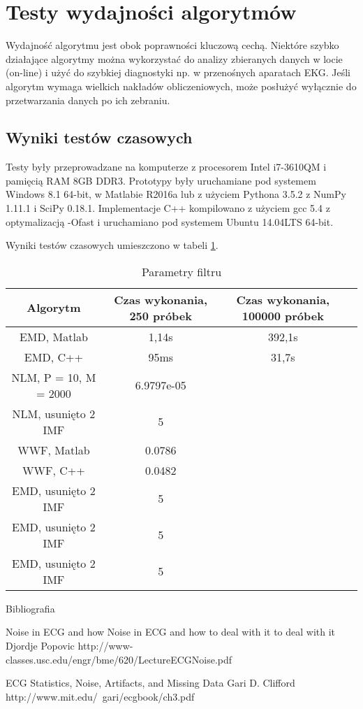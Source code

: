 \section{Testy wydajności algorytmów}

Wydajność algorytmu jest obok poprawności kluczową cechą. Niektóre szybko działające algorytmy można wykorzystać do analizy zbieranych danych w locie (on-line) i użyć do szybkiej diagnostyki np. w przenośnych aparatach EKG. Jeśli algorytm wymaga wielkich nakładów obliczeniowych, może posłużyć wyłącznie do przetwarzania danych po ich zebraniu.

\subsection{Wyniki testów czasowych}

Testy były przeprowadzane na komputerze z procesorem Intel i7-3610QM i pamięcią RAM 8GB DDR3. Prototypy były uruchamiane pod systemem Windows 8.1 64-bit, w Matlabie R2016a lub z użyciem Pythona 3.5.2 z NumPy 1.11.1 i SciPy 0.18.1. Implementacje C++ kompilowano z użyciem gcc 5.4 z optymalizacją -Ofast i uruchamiano pod systemem Ubuntu 14.04LTS 64-bit.

Wyniki testów czasowych umieszczono w tabeli \ref{tab:time}.

\begin{table}[!htb]
  \centering
  \begin{tabular}{|c|c|c|c|}
  \hline 
  Algorytm  & Czas wykonania, 250 próbek & Czas wykonania, 100000 próbek \\  
  \hline 
  EMD, Matlab & 1,14s & 392,1s\\
  \hline
  EMD, C++ & 95ms & 31,7s \\
  \hline
  NLM, P = 10, M = 2000  & 6.9797e-05 \\
  \hline
  NLM, usunięto 2 IMF  & 5 \\
  \hline
  WWF, Matlab  & 0.0786 \\
  \hline
  WWF, C++  & 0.0482 \\
  \hline
  EMD, usunięto 2 IMF  & 5 \\
  \hline
  EMD, usunięto 2 IMF  & 5 \\
  \hline
  EMD, usunięto 2 IMF  & 5 \\
  \hline
\end{tabular} 
\caption{Parametry filtru}
\label{tab:time}
\end{table}



Bibliografia

Noise in ECG and how Noise in ECG and how
to deal with it to deal with it
Djordje Popovic
http://www-classes.usc.edu/engr/bme/620/LectureECGNoise.pdf

ECG Statistics, Noise, Artifacts,
and Missing Data
Gari D. Clifford
http://www.mit.edu/~gari/ecgbook/ch3.pdf


